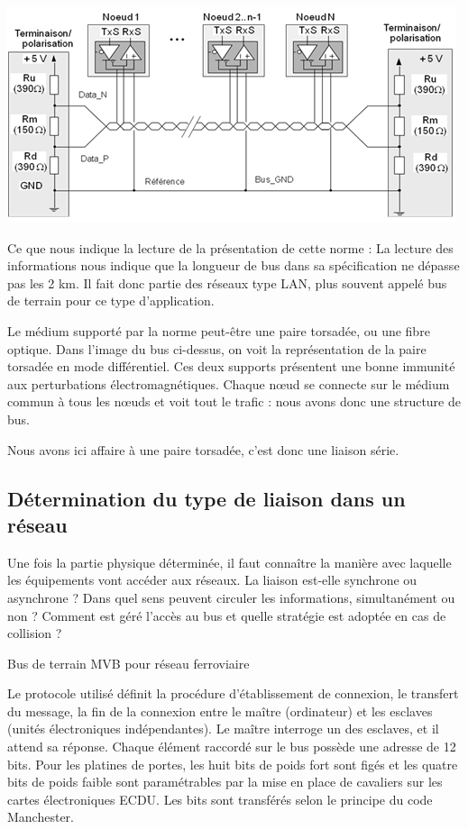 \documentclass[10pt]{article}
\begin{document}
\begin{center}
\includegraphics[width=.8\textwidth]{images/fig_24}
\end{center}

Ce que nous indique la lecture de la présentation de cette norme :
La lecture des informations nous indique que la longueur de bus dans sa spécification ne dépasse pas les 2 km. Il fait donc partie des réseaux type LAN, plus souvent appelé bus de terrain pour ce type d’application.

Le médium supporté par la norme peut-être une paire torsadée, ou une fibre optique. Dans l’image du bus ci-dessus, on voit la représentation de la paire torsadée en mode différentiel. Ces deux supports présentent une bonne immunité aux perturbations électromagnétiques.
Chaque nœud se connecte sur le médium commun à tous les nœuds et voit tout le trafic : nous avons donc une structure de bus.

Nous avons ici affaire à une paire torsadée, c’est donc une liaison série.

\subsection{Détermination du type de liaison dans un réseau}
Une fois la partie physique déterminée, il faut connaître la manière avec laquelle les équipements vont accéder aux réseaux.
La liaison est-elle synchrone ou asynchrone ?
Dans quel sens peuvent circuler les informations, simultanément ou non ?
Comment est géré l’accès au bus et quelle stratégie est adoptée en cas de collision ?

\begin{exemple}
Bus de terrain MVB pour réseau ferroviaire
\end{exemple}

Le protocole utilisé définit la procédure d’établissement de connexion, le transfert du message, la fin de la connexion entre le maître (ordinateur) et les esclaves (unités électroniques indépendantes). Le maître interroge un des esclaves, et il attend sa réponse. 
Chaque élément raccordé sur le bus possède une adresse de 12 bits. Pour les platines de portes, les huit bits de poids fort sont figés et les quatre bits de poids faible sont paramétrables par la mise en place de cavaliers sur les cartes électroniques ECDU. Les bits sont transférés selon le principe du code Manchester. 
\end{document}
